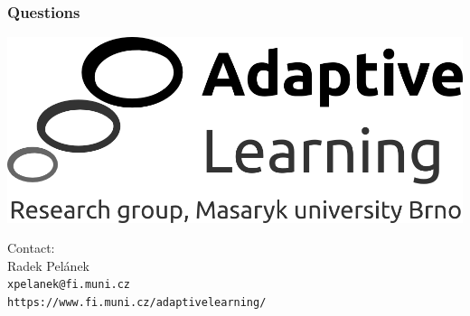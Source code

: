 \documentclass[bigger]{beamer}
\begin{document}
\begin{frame}
  \frametitle{Questions}

  \begin{center}
    \includegraphics[width=.5\linewidth]{al-logo}
  \end{center}

  Contact:\\
  Radek Pel\'anek\\
  \texttt{xpelanek@fi.muni.cz}\\
  \texttt{https://www.fi.muni.cz/adaptivelearning/}
\end{frame}
\end{document}
